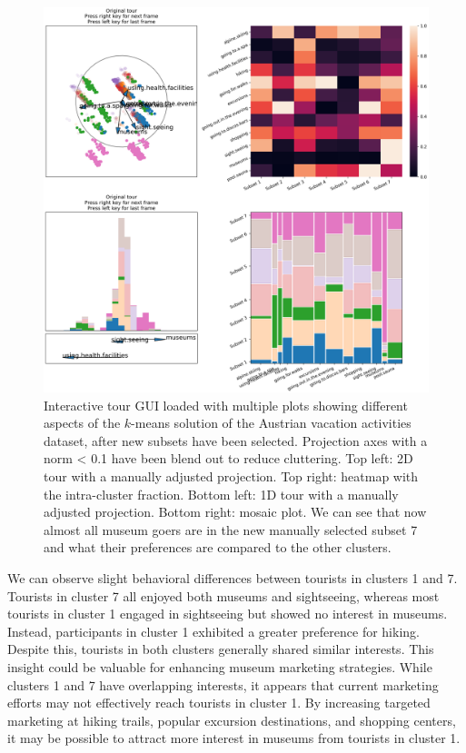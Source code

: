\documentclass[article]{ajs}
\begin{document}
\begin{figure}[h!]
    \centering
    \includegraphics[width=1\textwidth]{winter_cl7_post.pdf}
    \caption{Interactive tour GUI loaded with multiple plots showing different aspects of the $k$-means solution of the Austrian vacation activities dataset, after new subsets have been selected. Projection axes with a norm < 0.1 have been blend out to reduce cluttering. Top left: 2D tour with a manually adjusted projection. Top right: heatmap with the intra-cluster fraction. Bottom left: 1D tour with a manually adjusted projection. Bottom right: mosaic plot. We can see that now almost all museum goers are in the new manually selected subset 7 and what their preferences are compared to the other clusters.}
    \label{fig:winter_cl7_post}
\end{figure}


We can observe slight behavioral differences between tourists in clusters 1 and 7. Tourists in cluster 7 all enjoyed both museums and sightseeing, whereas most tourists in cluster 1 engaged in sightseeing but showed no interest in museums. Instead, participants in cluster 1 exhibited a greater preference for hiking. Despite this, tourists in both clusters generally shared similar interests. This insight could be valuable for enhancing museum marketing strategies. While clusters 1 and 7 have overlapping interests, it appears that current marketing efforts may not effectively reach tourists in cluster 1. By increasing targeted marketing at hiking trails, popular excursion destinations, and shopping centers, it may be possible to attract more interest in museums from tourists in cluster 1.
\end{document}
